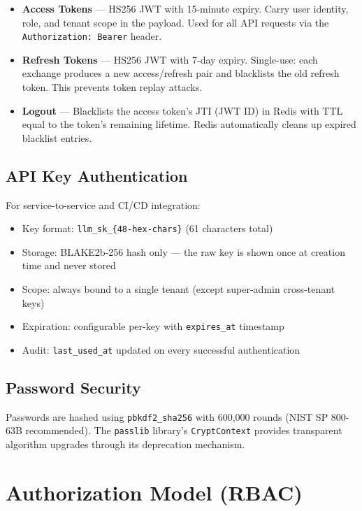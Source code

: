 \documentclass[12pt,a4paper,twoside]{report}
\begin{document}
\begin{itemize}
  \item \textbf{Access Tokens} — HS256 JWT with 15-minute expiry. Carry user identity, role, and tenant scope in the payload. Used for all API requests via the \texttt{Authorization: Bearer} header.

  \item \textbf{Refresh Tokens} — HS256 JWT with 7-day expiry. Single-use: each exchange produces a new access/refresh pair and blacklists the old refresh token. This prevents token replay attacks.

  \item \textbf{Logout} — Blacklists the access token's JTI (JWT ID) in Redis with TTL equal to the token's remaining lifetime. Redis automatically cleans up expired blacklist entries.
\end{itemize}

\subsection{API Key Authentication}

For service-to-service and CI/CD integration:

\begin{itemize}
  \item Key format: \texttt{llm\_sk\_\{48-hex-chars\}} (61 characters total)
  \item Storage: BLAKE2b-256 hash only — the raw key is shown once at creation time and never stored
  \item Scope: always bound to a single tenant (except super-admin cross-tenant keys)
  \item Expiration: configurable per-key with \texttt{expires\_at} timestamp
  \item Audit: \texttt{last\_used\_at} updated on every successful authentication
\end{itemize}

\subsection{Password Security}

Passwords are hashed using \texttt{pbkdf2\_sha256} with 600,000 rounds (NIST SP 800-63B recommended). The \texttt{passlib} library's \texttt{CryptContext} provides transparent algorithm upgrades through its deprecation mechanism.

\section{Authorization Model (RBAC)}
\end{document}
